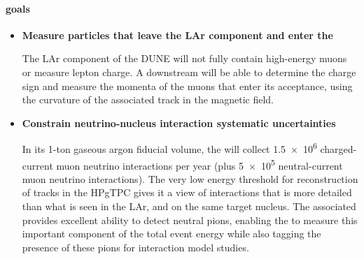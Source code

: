 \paragraph{ goals}
\begin{itemize}

\item {{\bf Measure particles that leave the LAr  component and enter the }  
    
The LAr component of the DUNE  will not fully contain high-energy muons or measure lepton charge.  A downstream  will be able to determine the charge sign and measure the momenta of the muons that enter its acceptance, using the curvature of the associated track in the magnetic field. } 


    \item {{\bf Constrain neutrino-nucleus interaction systematic uncertainties}

%
In its 1-ton gaseous argon fiducial volume, the  will collect \num{1.5e6} charged-current muon neutrino interactions per year (plus \num{5e5} neutral-current muon neutrino interactions). The very low energy threshold for reconstruction of tracks in the HPgTPC gives it a view of interactions that is more detailed than what is seen in the LAr, and on the same target nucleus. The associated  provides excellent ability to detect neutral pions, enabling the  to measure this important component of the total event energy while also tagging the presence of these pions for interaction model studies.


}
\end{itemize}
